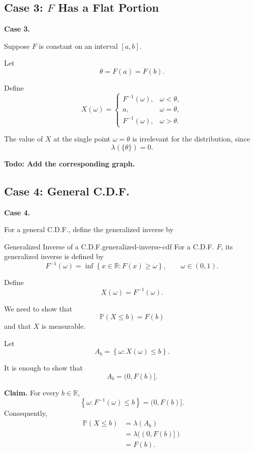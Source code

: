 \subsection{Case 3: $F$ Has a Flat Portion}

\textbf{Case 3.}

Suppose $F$ is constant on an interval $[a,b]$.

Let
\[
\theta=F(a)=F(b).
\]

Define
\[
X(\omega)
=
\begin{cases}
F^{-1}(\omega), & \omega<\theta,\\[4pt]
a, & \omega=\theta,\\[4pt]
F^{-1}(\omega), & \omega>\theta.
\end{cases}
\]

The value of $X$ at the single point $\omega=\theta$ is irrelevant
for the distribution, since
\[
\lambda(\{\theta\})=0.
\]

\begin{center}
    \textbf{Todo: Add the corresponding graph.}
\end{center}

\subsection{Case 4: General C.D.F.}

\textbf{Case 4.}

For a general C.D.F., define the generalized inverse by

\begin{definition}{Generalized Inverse of a C.D.F.}{generalized-inverse-cdf}
For a C.D.F. $F$, its generalized inverse is defined by
\[
F^{-1}(\omega)
=
\inf
\left\{
x\in\mathbb{R}: F(x)\geq\omega
\right\},
\qquad
\omega\in(0,1).
\]
\end{definition}
Define
\[
X(\omega)=F^{-1}(\omega).
\]

We need to show that
\[
\mathbb{P}(X\leq b)=F(b)
\]
and that $X$ is measurable.

Let
\[
A_b
=
\left\{
\omega:X(\omega)\leq b
\right\}.
\]

It is enough to show that
\[
A_b=(0,F(b)].
\]

\medskip
\noindent\textbf{Claim.}
For every $b\in\mathbb{R}$,
\[
\left\{
\omega:F^{-1}(\omega)\leq b
\right\}
=
(0,F(b)].
\]
\medskip
Consequently,
\[
\begin{aligned}
\mathbb{P}(X\leq b)
&=
\lambda(A_b)\\
&=
\lambda((0,F(b)])\\
&=
F(b).
\end{aligned}
\]


